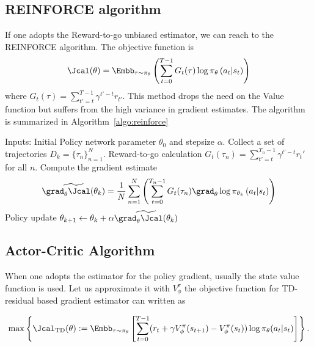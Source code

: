 \subsection{REINFORCE algorithm}
If one adopts the Reward-to-go unbiased estimator, we can reach to the REINFORCE algorithm. The objective function is
\begin{equation}
\label{eq:reinforce.obj}
     \Jcal(\theta)  = \Embb_{\tau\sim \pi_\theta}\left(\sum_{t=0}^{T-1}G_t(\tau)\log \pi_\theta\left(a_t | s_t\right) \right)
\end{equation}
where $G_t(\tau) = \sum_{t'=t}^{T-1}\gamma^{t'-t}r_{t'}$. 
This method drops the need on the Value function but suffers from the high variance in gradient estimates. The algorithm is summarized in Algorithm~\ref{algo:reinforce}

\begin{algorithm}[H]
\caption{REINFORCE}
\begin{algorithmic}[1]
    \State Inputs: Initial Policy network parameter $\theta_0$ and stepsize $\alpha$.
        \State Collect a set of trajectories $D_k=\{\tau_n\}_{n=1}^{N}$.
        \State Reward-to-go calculation $G_t(\tau_n) = \sum_{t'=t}^{T_n-1}\gamma^{t'-t}r_t'$ for all $n$.
        \State Compute the gradient estimate
         $$
            \widetilde{\grad_{\theta} \Jcal(\theta_k)}  = \frac{1}{N}\sum_{n=1}^{N} \left(\sum_{t=0}^{T_{n}-1}G_t(\tau_n)\grad_{\theta}\log \pi_{\theta_k}\left(a_t | s_t\right) \right)
        $$
        \State Policy update $\theta_{k+1} \gets \theta_k + \alpha \widetilde{\grad_{\theta} \Jcal(\theta_k)}$
    \EndFor
\end{algorithmic}
\label{algo:reinforce}
\end{algorithm}


\subsection{Actor-Critic Algorithm} 
When one adopts the estimator for the policy gradient, usually the state value function is used. Let us approximate it with $V^{\pi}_{\phi}$ the objective function for TD-residual based gradient estimator can written as

\begin{align*}
     \max \left\{\Jcal_{\text{TD}}(\theta):= \Embb_{\tau\sim \pi_{\theta}}\left[ \sum_{t=0}^{T-1}(r_t+\gamma V^{\pi}_{\phi}(s_{t+1}) - V^{\pi}_{\phi}(s_{t}))\log\pi_{\theta}(a_t|s_t)\right]\right\}.
\end{align*}

